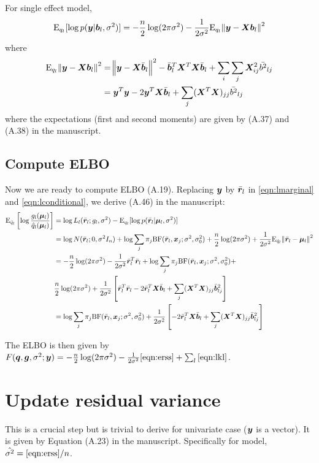 For single effect model,
\begin{equation}
    \text{E}_{q_l}[\log p(\bm y|\bm b_l,\sigma^2)] = -\frac{n}{2}\log(2\pi\sigma^2) - \frac{1}{2\sigma^2}\text{E}_{q_l}\norm{\bm y - \bm X\bm b_l}^2  \label{eqn:lconditional}
\end{equation}
where
\begin{align}
    \text{E}_{q_l}\norm{\bm y - \bm X\bm b_l}^2 &= \norm{\bm y - \bm X \bar{\bm{b}}_l}^2 - \bar{\bm{b}}_l^T\bm X^T\bm X \bar{\bm{b}}_l + \sum_i \sum_j \bm X_{ij}^2 \bar{b^2}_{lj} \\
    &= \bm y^T\bm y -2 \bm y^T \bm X \bar{\bm{b}}_l  + \sum_j (\bm X^T \bm X)_{jj} \bar{b^2}_{lj}
\end{align}
where the expectations (first and second moments) are given by (A.37) and (A.38) in the manuscript. 

\subsection{Compute ELBO}
Now we are ready to compute ELBO (A.19).
Replacing $\bm y$ by $\bar{\bm r}_l$ in \eqref{eqn:lmarginal} and \eqref{eqn:lconditional}, we derive (A.46) in the manuscript:
\begin{align}
    \text{E}_{\hat{q}_l} \left[ \log \frac{g_l(\bm \mu_l)}{\hat{q}_l(\bm \mu_l)} \right] &= \log L_l(\bar{\bm r}_l; g_l,\sigma^2) - \text{E}_{q_l}[\log p(\bar{\bm r}_l|\bm \mu_l,\sigma^2)]  \\
    &= \log N(\bar{\bm r}_l; 0, \sigma^2 I_n) + \log \sum_j \pi_j \text{BF}(\bar{\bm r}_l, \bm x_j; \sigma^2, \sigma^2_0) + \frac{n}{2} \log(2\pi\sigma^2) +\frac{1}{2\sigma^2}\text{E}_{\hat{q}_l}\norm{\bar{\bm r}_l-\bm \mu_l}^2 \\
    &= -\frac{n}{2} \log(2\pi\sigma^2) -\frac{1}{2\sigma^2}\bar{\bm r}_l^T\bar{\bm r}_l + \log \sum_j \pi_j \text{BF}(\bar{\bm r}_l, \bm x_j; \sigma^2, \sigma^2_0) + \\
    & \frac{n}{2} \log(2\pi\sigma^2) +\frac{1}{2\sigma^2}\left[\bar{\bm r}_l^T\bar{\bm r}_l - 2\bar{\bm r}_l^T\bm X \bar{\bm b}_l + \sum_j (\bm X^T \bm X)_{jj} \bar{\bm b}_{lj}^2 \right] \\
    &= \log \sum_j \pi_j \text{BF}(\bar{\bm r}_l, \bm x_j; \sigma^2, \sigma^2_0) + \frac{1}{2\sigma^2}\left[- 2\bar{\bm r}_l^T\bm X \bar{\bm b}_l + \sum_j (\bm X^T \bm X)_{jj} \bar{\bm b}_{lj}^2\right] \label{eqn:lkl}
\end{align}

The ELBO is then given by $F({\bm q},\bm g,\sigma^2; \bm y) = -\frac{n}{2} \log(2\pi\sigma^2) - \frac{1}{2\sigma^2} \eqref{eqn:erss} + \sum_l \eqref{eqn:lkl}$.

\section{Update residual variance}
This is a crucial step but is trivial to derive for univariate case ($\bm y$ is a vector). It is given by Equation (A.23) in the manuscript. Specifically for \susie model, $\hat{\sigma^2} = \eqref{eqn:erss}/n$.

